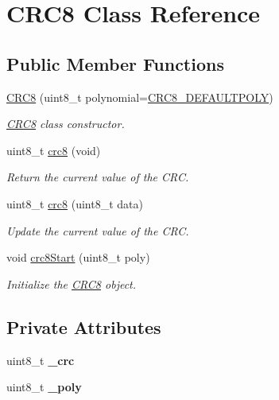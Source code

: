 \hypertarget{class_c_r_c8}{\section{C\-R\-C8 Class Reference}
\label{class_c_r_c8}
}
\subsection*{Public Member Functions}
\begin{DoxyCompactItemize}
\item 
\hyperlink{class_c_r_c8_aa55fad578b29297298f72e65b2494fdb}{C\-R\-C8} (uint8\-\_\-t polynomial=\hyperlink{_crc8_8h_a723f9adea4dfa42b246b0d248e57a794}{C\-R\-C8\-\_\-\-D\-E\-F\-A\-U\-L\-T\-P\-O\-L\-Y})
\begin{DoxyCompactList}\small\item\em \hyperlink{class_c_r_c8}{C\-R\-C8} class constructor. \end{DoxyCompactList}\item 
uint8\-\_\-t \hyperlink{class_c_r_c8_a03f58a9f90db0e1d22fc48ba486a3654}{crc8} (void)
\begin{DoxyCompactList}\small\item\em Return the current value of the C\-R\-C. \end{DoxyCompactList}\item 
uint8\-\_\-t \hyperlink{class_c_r_c8_a80f09a2c108b6b2ba0fcfed3e6f9544b}{crc8} (uint8\-\_\-t data)
\begin{DoxyCompactList}\small\item\em Update the current value of the C\-R\-C. \end{DoxyCompactList}\item 
void \hyperlink{class_c_r_c8_a38931d0b9e5ba8f2e974dca7dbf30e5a}{crc8\-Start} (uint8\-\_\-t poly)
\begin{DoxyCompactList}\small\item\em Initialize the \hyperlink{class_c_r_c8}{C\-R\-C8} object. \end{DoxyCompactList}\end{DoxyCompactItemize}
\subsection*{Private Attributes}
\begin{DoxyCompactItemize}
\item 
\hypertarget{class_c_r_c8_ad196e3d62b2681cd6a816caa6d8bd367}{uint8\-\_\-t {\bfseries \-\_\-crc}}\label{class_c_r_c8_ad196e3d62b2681cd6a816caa6d8bd367}

\item 
\hypertarget{class_c_r_c8_a460b39f317bfe37f3db601e90debf3d8}{uint8\-\_\-t {\bfseries \-\_\-poly}}\label{class_c_r_c8_a460b39f317bfe37f3db601e90debf3d8}

\end{DoxyCompactItemize}


